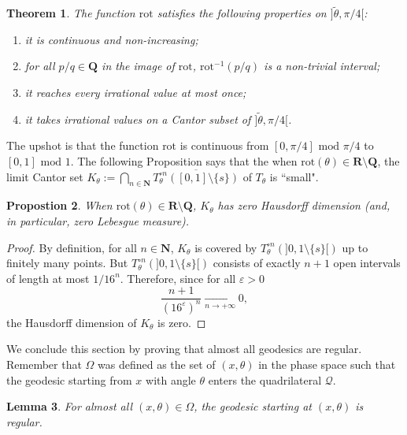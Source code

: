 \documentclass[11pt]{article}
\newtheorem{thm}{Theorem}[section]
\newtheorem{lemma}[thm]{Lemma}
\newtheorem{prop}[thm]{Propostion}
\begin{document}
\begin{thm}
\label{Paramtheta}
The function $\text{rot}$ satisfies the following properties on $\bigl]\widetilde{\theta},\pi/4\bigr[$:
\begin{enumerate}
    \item it is continuous and non-increasing;
    \item for all $p/q\in\mathbf{Q}$ in the image of $\text{rot}$, $\text{rot}^{-1}\left(p/q\right)$ is a non-trivial interval;
    \item it reaches every irrational value at most once;
    \item it takes irrational values on a Cantor subset of $\bigl]\widetilde{\theta},\pi/4\bigr[$.
\end{enumerate}
\end{thm}

The upshot is that the function $\text{rot}$ is continuous from $\left[0,\pi/4\right]\text{ mod }\pi/4$ to $\left[0,1\right]\text{ mod }1$. The following Proposition says that the when $\text{rot}(\theta)\in\mathbf{R}\setminus\mathbf{Q}$, the limit Cantor set $K_{\theta}:=\bigcap_{n\in\mathbf{N}}\overline{T_{\theta}^{\circ n}([0,1]\setminus\{s\})}$ of $T_{\theta}$ is ``small".

\begin{prop}
    When $\text{rot}(\theta)\in\mathbf{R}\setminus\mathbf{Q}$, $K_{\theta}$ has zero Hausdorff dimension (and, in particular, zero Lebesgue measure).
\end{prop}

\begin{proof}
By definition, for all $n\in\mathbf{N}$, $K_{\theta}$ is covered by $T_{\theta}^{\circ n}(]0,1\setminus\{s\}[)$ up to finitely many points. But $T_{\theta}^{\circ n}(]0,1\setminus\{s\}[)$ consists of exactly $n+1$ open intervals of length at most $1/16^{n}$. Therefore, since for all $\varepsilon>0$
\[
\frac{n+1}{\left(16^{\varepsilon}\right)^{n}}\xrightarrow[n\rightarrow+\infty]{}0,
\]
the Hausdorff dimension of $K_{\theta}$ is zero.
\end{proof}

We conclude this section by proving that almost all geodesics are regular. Remember that $\Omega$ was defined as the set of $\left(x,\theta\right)$ in the phase space such that the geodesic starting from $x$ with angle $\theta$ enters the quadrilateral $\mathcal{Q}$.

\begin{lemma}
    \label{lemma:definfgen}
    For almost all $\left(x,\theta\right)\in\Omega$, the geodesic starting at $\left(x,\theta\right)$ is regular.
\end{lemma}
\end{document}
